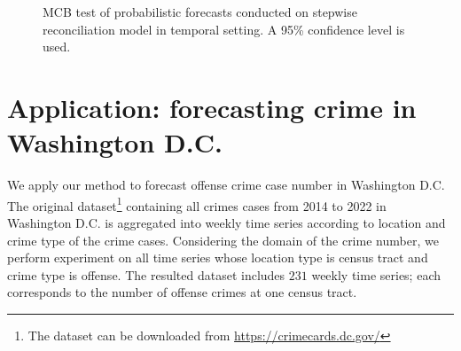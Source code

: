 \documentclass[a4paper,review,12pt,authoryear]{elsarticle}
\begin{document}
\begin{figure}
  \caption{\label{fig:sim_temporal_mcb_prob}MCB test of probabilistic forecasts conducted on stepwise reconciliation model in temporal setting. A 95\% confidence level is used.}
   \qquad
   \qquad
\end{figure}


\section{Application: forecasting crime in Washington D.C.}
\label{sec:applications}

We apply our method to forecast offense crime case number in Washington D.C. The original dataset\footnote{The dataset can be downloaded from \url{https://crimecards.dc.gov/}} containing all crimes cases from 2014 to 2022 in Washington D.C. is aggregated into weekly time series according to location and crime type of the crime cases. 
Considering the domain of the crime number, we perform experiment on all time series whose location type is census tract and crime type is offense.
The resulted dataset includes $231$ weekly time series; each corresponds to the number of offense crimes at one census tract.
\end{document}
